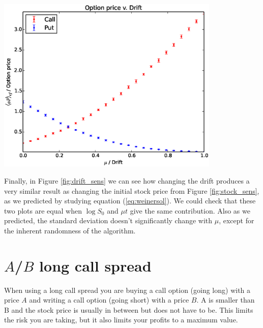 \documentclass[8 pt]{article}
\newenvironment{Figure}
  {\par\medskip\noindent\minipage{\linewidth}}
  {\endminipage\par\medskip}
\begin{document}
\begin{multicols*}{2}
\begin{Figure}
  \begin{center}
    \includegraphics[width=0.8\textwidth]{graphs/oP_drift.eps}
    \label{fig:drift_sens}
  \end{center}
\end{Figure}

Finally, in Figure \ref{fig:drift_sens} we can see how changing the drift produces a very similar result as changing the initial stock price from Figure \ref{fig:stock_sens}, as we predicted by studying equation (\ref{eq:weinersol}). We could check that these two plots are equal when $\log S_0$ and $\mu t$ give the same contribution. Also as we predicted, the standard deviation doesn't significantly change with $\mu$, except for the inherent randomness of the algorithm.

\section{$A$/$B$ long call spread}

When using a long call spread you are buying a call option (going long) with a price $A$ and writing a call option (going short) with a price $B$. A is smaller than B and the stock price is usually in between but does not have to be. This limits the risk you are taking, but it also limits your profits to a maximum value.


\end{multicols*}
\end{document}
